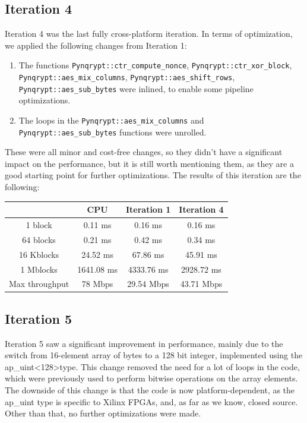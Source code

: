 \documentclass[12pt,oneside,a4paper]{article}
\begin{document}
\subsection{Iteration 4} \label{subsec:iter4}
Iteration 4 was the last fully cross-platform iteration.
In terms of optimization, we applied the following changes from Iteration 1:
\begin{enumerate}
	\item The functions {\tt Pynqrypt::ctr\_compute\_nonce}, {\tt Pynqrypt::ctr\_xor\_block}, {\tt Pynqrypt::aes\_mix\_columns}, {\tt Pynqrypt::aes\_shift\_rows}, \\ {\tt Pynqrypt::aes\_sub\_bytes} were inlined, to enable some pipeline optimizations.
	\item The loops in the {\tt Pynqrypt::aes\_mix\_columns} and {\tt Pynqrypt::aes\_sub\_bytes} functions were unrolled.
\end{enumerate}

These were all minor and cost-free changes, so they didn't have a significant impact on the performance, but it is still worth mentioning them, as they are a good starting point for further optimizations.
The results of this iteration are the following:
\begin{table}[h!]
	\centering
	\begin{tabular}{cccc}
		\toprule
		 & CPU & Iteration 1 & Iteration 4 \\
		\midrule
		1 block & 0.11 ms & 0.16 ms & 0.16 ms \\
		64 blocks & 0.21 ms & 0.42 ms & 0.34 ms \\
		16 Kblocks & 24.52 ms & 67.86 ms & 45.91 ms \\
		1 Mblocks & 1641.08 ms & 4333.76 ms & 2928.72 ms \\
		Max throughput & 78 Mbps & 29.54 Mbps & 43.71 Mbps \\
		\bottomrule
	\end{tabular}
\end{table}

\subsection{Iteration 5} \label{subsec:iter5}
Iteration 5 saw a significant improvement in performance, mainly due to the switch from 16-element array of bytes to a 128 bit integer, implemented using the ap\_uint\textless128\textgreater type.
This change removed the need for a lot of loops in the code, which were previously used to perform bitwise operations on the array elements.
The downside of this change is that the code is now platform-dependent, as the ap\_uint type is specific to Xilinx FPGAs, and, as far as we know, closed source. Other than that, no further optimizations were made.
\end{document}
